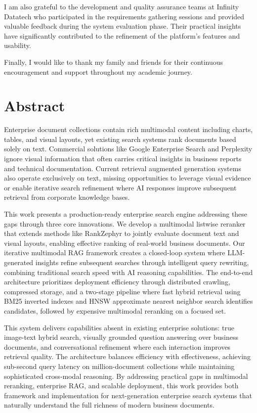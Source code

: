 \documentclass{report}
\begin{document}
I am also grateful to the development and quality assurance teams at Infinity Datatech who participated in the requirements gathering sessions and provided valuable feedback during the system evaluation phase. Their practical insights have significantly contributed to the refinement of the platform's features and usability.

Finally, I would like to thank my family and friends for their continuous encouragement and support throughout my academic journey.

\clearpage

\chapter*{Abstract}

Enterprise document collections contain rich multimodal content including charts, tables, and visual layouts, yet existing search systems rank documents based solely on text. Commercial solutions like Google Enterprise Search and Perplexity ignore visual information that often carries critical insights in business reports and technical documentation. Current retrieval augmented generation systems also operate exclusively on text, missing opportunities to leverage visual evidence or enable iterative search refinement where AI responses improve subsequent retrieval from corporate knowledge bases.

This work presents a production-ready enterprise search engine addressing these gaps through three core innovations. We develop a multimodal listwise reranker that extends methods like RankZephyr to jointly evaluate document text and visual layouts, enabling effective ranking of real-world business documents. Our iterative multimodal RAG framework creates a closed-loop system where LLM-generated insights refine subsequent searches through intelligent query rewriting, combining traditional search speed with AI reasoning capabilities. The end-to-end architecture prioritizes deployment efficiency through distributed crawling, compressed storage, and a two-stage pipeline where fast hybrid retrieval using BM25 inverted indexes and HNSW approximate nearest neighbor search identifies candidates, followed by expensive multimodal reranking on a focused set.

This system delivers capabilities absent in existing enterprise solutions: true image-text hybrid search, visually grounded question answering over business documents, and conversational refinement where each interaction improves retrieval quality. The architecture balances efficiency with effectiveness, achieving sub-second query latency on million-document collections while maintaining sophisticated cross-modal reasoning. By addressing practical gaps in multimodal reranking, enterprise RAG, and scalable deployment, this work provides both framework and implementation for next-generation enterprise search systems that naturally understand the full richness of modern business documents.
\clearpage
\end{document}
